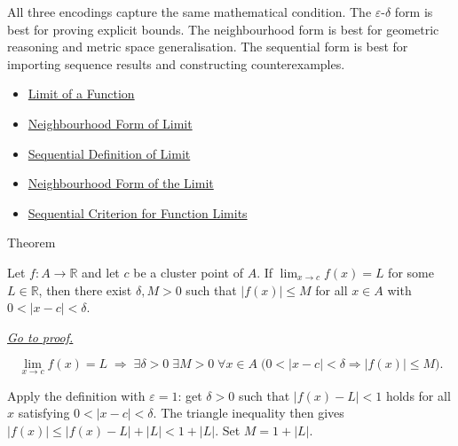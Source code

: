\begin{remark*}[Interpretation]
All three encodings capture the same mathematical condition. The
$\varepsilon$-$\delta$ form is best for proving explicit bounds. The
neighbourhood form is best for geometric reasoning and metric space
generalisation. The sequential form is best for importing sequence
results and constructing counterexamples.
\end{remark*}

\begin{dependencies}
\begin{itemize}
  \item \hyperref[def:limit-function]{Limit of a Function}
  \item \hyperref[def:limit-function-neighbourhood]{Neighbourhood Form of Limit}
  \item \hyperref[def:limit-function-sequential]{Sequential Definition of Limit}
  \item \hyperref[prop:limit-neighbourhood-equiv]{Neighbourhood Form of the Limit}
  \item \hyperref[prop:sequential-criterion-limits]{Sequential Criterion for Function Limits}
\end{itemize}
\end{dependencies}


\begin{theorembox}{Theorem}
\begin{theorem}
\label{thm:limit-implies-local-bounding}
Let $f : A \to \mathbb{R}$ and let $c$ be a cluster point of $A$.
If $\lim_{x\to c}f(x)=L$ for some $L \in \mathbb{R}$,
then there exist $\delta, M > 0$ such that $|f(x)| \leq M$ for all
$x \in A$ with $0<|x-c|<\delta$.

\smallskip\noindent
\hyperref[prf:limit-implies-local-bounding]{\textit{Go to proof.}}
\end{theorem}
\end{theorembox}

\begin{remark*}
\[
  \lim_{x\to c}f(x)=L
  \;\Rightarrow\;
  \exists\delta>0\;\exists M>0\;\forall x\in A\;
  \bigl(0<|x-c|<\delta\Rightarrow |f(x)|\leq M\bigr).
\]
\end{remark*}

\begin{remark*}
Apply the definition with $\varepsilon = 1$: get $\delta > 0$ such
that $|f(x)-L|<1$ holds for all $x$
satisfying $0<|x-c|<\delta$. The triangle
inequality then gives $|f(x)| \leq |f(x)-L| + |L| < 1 + |L|$.
Set $M = 1 + |L|$.
\end{remark*}

